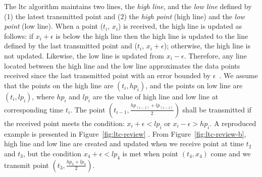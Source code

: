 The \acrshort{ltc} algorithm maintains two lines, the \emph{high line}, and the
\emph{low line} defined by (1) the latest transmitted point and (2) the
\emph{high point} (high line) and the \emph{low point} (low line). When a point
($t_i$, $x_i$) is received, the high line is updated as follows: if
$x_i+\epsilon$ is below the high line then the high line is updated to the line
defined by the last transmitted point and ($t_i$, $x_i+\epsilon$); otherwise,
the high line is not updated. Likewise, the low line is updated from
$x_i-\epsilon$. Therefore, any line located between the high line and the low
line approximates the data points received since the last transmitted point with
an error bounded by $\epsilon$~\cite{schoellhammer2004lightweight}. We assume
that the points on the high line are $(t_i, hp_i)$, and the points on low line
are $(t_i, lp_i)$, where $hp_i$ and $lp_i$ are the value of high line and low
line at corresponding time $t_i$.
The point $(t_{i-1}, \frac{hp_{(i-1)}+lp_{(i-1)}}{2})$ shall be transmitted if
the received point meets the condition:
$x_i+\epsilon < lp_{i}$ or $x_i-\epsilon > hp_{i}$. A reproduced example is
presented in Figure~\ref{fig:ltc-review} . From Figure~\ref{fig:ltc-review-b},
high line and low line are created and updated when we receive point at time
$t_2$ and $t_3$, but the condition $x_4+\epsilon < lp_{4}$ is met when point
$(t_4, x_4)$ come and we transmit point $(t_3, \frac{hp_{3}+lp_{3}}{2})$.

